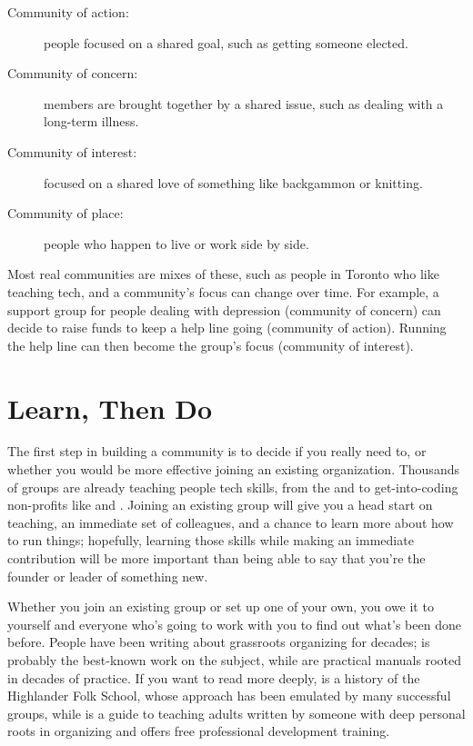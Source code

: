 \begin{description}

\item[Community of action:]
  people focused on a shared goal,
  such as getting someone elected.

\item[Community of concern:]
  members are brought together by a shared issue,
  such as dealing with a long-term illness.

\item[Community of interest:]
  focused on a shared love of something like backgammon or knitting.

\item[Community of place:]
  people who happen to live or work side by side.

\end{description}

Most real communities are mixes of these,
such as people in Toronto who like teaching tech,
and a community's focus can change over time.
For example,
a support group for people dealing with depression (community of concern)
can decide to raise funds to keep a help line going (community of action).
Running the help line can then become the group's focus (community of interest).

\section{Learn, Then Do}\label{s:community-learn-then-do}

The first step in building a community is to decide if you really need to,
or whether you would be more effective joining an existing organization.
Thousands of groups are already teaching people tech skills,
from the 
and 
to get-into-coding non-profits like
and .
Joining an existing group will give you a head start on teaching,
an immediate set of colleagues,
and a chance to learn more about how to run things;
hopefully,
learning those skills while making an immediate contribution
will be more important than being able to say that
you're the founder or leader of something new.

Whether you join an existing group or set up one of your own,
you owe it to yourself and everyone who's going to work with you
to find out what's been done before.
People have been writing about grassroots organizing for decades;
\cite{Alin1989} is probably the best-known work on the subject,
while \cite{Brow2007,Midw2010} are practical manuals rooted in decades of practice.
If you want to read more deeply,
\cite{Adam1975} is a history of the Highlander Folk School,
whose approach has been emulated by many successful groups,
while \cite{Spal2014} is a guide to teaching adults
written by someone with deep personal roots in organizing
and 
offers free professional development training.

